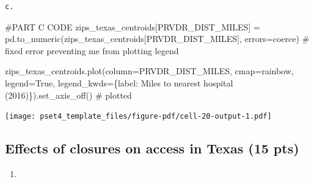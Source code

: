 \documentclass[
  letterpaper,
  DIV=11,
  numbers=noendperiod]{scrartcl}
\newenvironment{Shaded}{\begin{snugshade}}{\end{snugshade}}
\newcommand{\CommentTok}[1]{\textcolor[rgb]{0.37,0.37,0.37}{#1}}
\newcommand{\NormalTok}[1]{\textcolor[rgb]{0.00,0.23,0.31}{#1}}
\newcommand{\OperatorTok}[1]{\textcolor[rgb]{0.37,0.37,0.37}{#1}}
\newcommand{\StringTok}[1]{\textcolor[rgb]{0.13,0.47,0.30}{#1}}
\newcommand{\VariableTok}[1]{\textcolor[rgb]{0.07,0.07,0.07}{#1}}
\providecommand{\tightlist}{%
  \setlength{\itemsep}{0pt}\setlength{\parskip}{0pt}}\usepackage{longtable,booktabs,array}
\begin{document}
\begin{verbatim}
c.
\end{verbatim}

\begin{Shaded}
\begin{Highlighting}[]
\CommentTok{\#PART C CODE}
\NormalTok{zips\_texas\_centroids[}\StringTok{\textquotesingle{}PRVDR\_DIST\_MILES\textquotesingle{}}\NormalTok{] }\OperatorTok{=}\NormalTok{ pd.to\_numeric(zips\_texas\_centroids[}\StringTok{\textquotesingle{}PRVDR\_DIST\_MILES\textquotesingle{}}\NormalTok{], errors}\OperatorTok{=}\StringTok{\textquotesingle{}coerce\textquotesingle{}}\NormalTok{) }\CommentTok{\# fixed error preventing me from plotting legend}

\NormalTok{zips\_texas\_centroids.plot(column}\OperatorTok{=}\StringTok{\textquotesingle{}PRVDR\_DIST\_MILES\textquotesingle{}}\NormalTok{, cmap}\OperatorTok{=}\StringTok{\textquotesingle{}rainbow\textquotesingle{}}\NormalTok{, legend}\OperatorTok{=}\VariableTok{True}\NormalTok{, legend\_kwds}\OperatorTok{=}\NormalTok{\{}\StringTok{\textquotesingle{}label\textquotesingle{}}\NormalTok{: }\StringTok{\textquotesingle{}Miles to nearest hospital (2016)\textquotesingle{}}\NormalTok{\}).set\_axis\_off() }\CommentTok{\# plotted}
\end{Highlighting}
\end{Shaded}

\texttt{[image: pset4\_template\_files/figure-pdf/cell-20-output-1.pdf]}

\subsection{Effects of closures on access in Texas (15
pts)}\label{effects-of-closures-on-access-in-texas-15-pts}

\begin{enumerate}
\def\labelenumi{\arabic{enumi}.}
\tightlist
\item
\end{enumerate}
\end{document}
